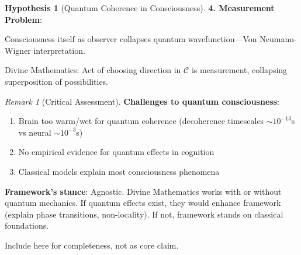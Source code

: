\documentclass[11pt,a4paper]{article}
\theoremstyle{definition}
\newtheorem{hypothesis}{Hypothesis}[section]
\theoremstyle{remark}
\newtheorem{remark}{Remark}[section]
\newcommand{\CC}{\mathcal{C}}
\newcommand{\cc}{\mathbf{c}}
\begin{document}
\begin{small}
\begin{enumerate}
\begin{hypothesis}[Quantum Coherence in Consciousness]
\textbf{4. Measurement Problem}:

Consciousness itself as observer collapses quantum wavefunction—Von Neumann-Wigner interpretation.

Divine Mathematics: Act of choosing direction in \(\CC\) is measurement, collapsing superposition of possibilities.
\end{hypothesis}

\begin{remark}[Critical Assessment]
\textbf{Challenges to quantum consciousness}:
\begin{enumerate}
    \item Brain too warm/wet for quantum coherence (decoherence timescales \(\sim 10^{-13}\)s vs neural \(\sim 10^{-3}\)s)
    \item No empirical evidence for quantum effects in cognition
    \item Classical models explain most consciousness phenomena
\end{enumerate}

\textbf{Framework's stance}: Agnostic. Divine Mathematics works with or without quantum mechanics. If quantum effects exist, they would enhance framework (explain phase transitions, non-locality). If not, framework stands on classical foundations.

Include here for completeness, not as core claim.
\end{remark}

\begin{figure}[H]
\centering
{}
\end{figure}
\end{enumerate}
\end{small}
\end{document}
